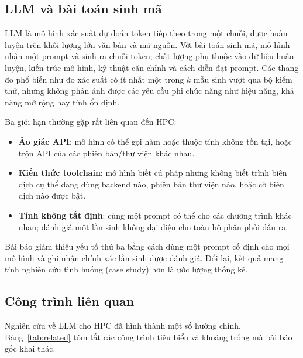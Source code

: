 \subsection{LLM và bài toán sinh mã}

LLM là mô hình xác suất dự đoán token tiếp theo trong một chuỗi, được huấn luyện
trên khối lượng lớn văn bản và mã nguồn. Với bài toán sinh mã, mô hình nhận một
prompt và sinh ra chuỗi token; chất lượng phụ thuộc vào dữ liệu huấn luyện, kiến
trúc mô hình, kỹ thuật căn chỉnh và cách diễn đạt prompt. Các thang đo phổ biến
như  đo xác suất có ít nhất một trong $k$ mẫu sinh vượt qua bộ kiểm
thử, nhưng không phản ánh được các yêu cầu phi chức năng như hiệu năng, khả năng
mở rộng hay tính ổn định.

Ba giới hạn thường gặp rất liên quan đến HPC:

\begin{itemize}
  \item \textbf{Ảo giác API}: mô hình có thể gọi hàm hoặc thuộc tính không tồn tại,
        hoặc trộn API của các phiên bản/thư viện khác nhau.
  \item \textbf{Kiến thức toolchain}: mô hình biết cú pháp nhưng không biết trình
        biên dịch cụ thể đang dùng backend nào, phiên bản thư viện nào, hoặc cờ
        biên dịch nào được bật.
  \item \textbf{Tính không tất định}: cùng một prompt có thể cho các chương trình
        khác nhau; đánh giá một lần sinh không đại diện cho toàn bộ phân phối đầu
        ra.
\end{itemize}

Bài báo giảm thiểu yếu tố thứ ba bằng cách dùng một prompt cố định cho mọi mô
hình và ghi nhận chính xác lần sinh được đánh giá. Đổi lại, kết quả mang tính
nghiên cứu tình huống (case study) hơn là ước lượng thống kê.

\subsection{Công trình liên quan}

Nghiên cứu về LLM cho HPC đã hình thành một số hướng chính. Bảng~\ref{tab:related}
tóm tắt các công trình tiêu biểu và khoảng trống mà bài báo gốc khai thác.

